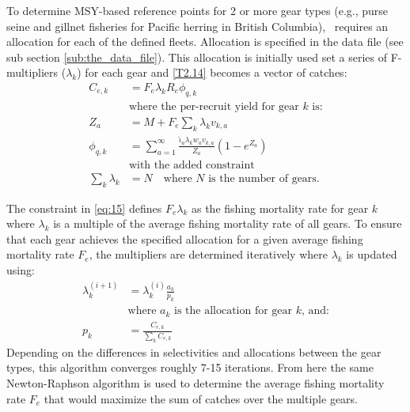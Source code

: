 \begin{multicols}{2}
To determine MSY-based reference points for 2 or more gear types (e.g.,  purse seine and gillnet fisheries for Pacific herring in British Columbia), \iscam\ requires an allocation for each of the defined fleets.  Allocation is specified in the data file (see sub section \ref{sub:the_data_file}).  This allocation is initially used set a series of F-multipliers ($\lambda_k$) for each gear and \eqref{T2.14} becomes a vector of catches:
\begin{align}
	C_{e,k} &= F_e \lambda_k R_e \phi_{q,k} \label{eq:12} \\
	&\mbox{where the per-recruit yield for gear $k$ is:} \nonumber \\
	Z_a &= M+F_e\sum_k \lambda_kv_{k,a}\label{eq:13}\\
	\phi_{q,k}&=\sum_{a=1}^\infty
        \frac{ \hat{\iota}_a \lambda_k w_a v_{k,a}}{Z_a}
        \left(1-e^{Z_a}\right)\label{eq:14}\\
    &\mbox{with the added constraint} \nonumber\\
    \sum_k \lambda_k &= N \label{eq:15}\quad \mbox{where $N$ is the number of gears.}
\end{align}

The constraint in \eqref{eq:15} defines $F_e\lambda_k$ as the fishing mortality rate for gear $k$ where $\lambda_k$ is a multiple of the average fishing mortality rate of all gears.  To ensure that each gear achieves the specified allocation for a given average fishing mortality rate $F_e$, the multipliers are determined iteratively where $\lambda_k$ is updated using:
\begin{align}
	\lambda_k^{(i+1)} &= \lambda_k^{(i)} \frac{a_k}{p_k} \label{eq:16}\\
	&\mbox{where $a_k$ is the allocation for gear $k$, and:}\nonumber\\
	p_k &= \frac{C_{e,k}}{\sum_k C_{e,k}}\label{eq:17}
\end{align}
Depending on the differences in selectivities and allocations between the gear types, this algorithm converges roughly 7-15 iterations.  From here the same Newton-Raphson algorithm is used to determine the average fishing mortality rate $F_e$ that would maximize the sum of catches over the multiple gears.  
\end{multicols}

\begin{multicols}{2}
	
\end{multicols}



